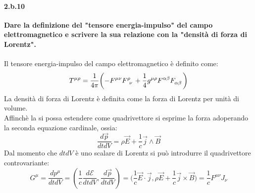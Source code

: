 \documentclass[twoside]{article}
\begin{document}
\paragraph{2.b.10}\textbf{Dare la definizione del "tensore energia-impulso" del campo elettromagnetico e
scrivere la sua relazione con la "densità di forza di Lorentz".}\\ \\
Il tensore energia-impulso del campo elettromagnetico è definito come:
\begin{equation}
    \tensor{T}{^\mu^\rho}=\frac{1}{4\pi} \biggl( -\tensor{F}{^\mu^\nu}\tensor{F}{^\rho_\nu}+\frac{1}{4}\tensor{g}{^\mu^\rho}\tensor{F}{^\alpha^\beta}\tensor{F}{_\alpha_\beta} \biggr)
\end{equation}
La densità di forza di Lorentz è definita come la forza di Lorentz per unità di volume.
\\
Affinchè la si possa estendere come quadrivettore si esprime la forza adoperando la seconda equazione cardinale, ossia:
\begin{equation}
    \frac{d\vec{p}}{dtdV}=\rho \vec{E}+\frac{1}{c}\vec{j}\wedge \vec{B}
\end{equation}
Dal momento che $dtdV$ è uno scalare di Lorentz si può introdurre il quadrivettore controvariante:
\begin{equation}\label{densità di forza}
    G^{\mu}=\frac{dp^{\mu}}{dtdV}=\left( \frac{1}{c}\frac{d\mathcal{E}}{dtdV},\frac{d\vec{p}}{dtdV} \right)=\biggl(\frac{1}{c}\vec{E}\cdot \vec{j},\rho \vec{E}+\frac{1}{c}\vec{j}\times\vec{B}\biggr)=\frac{1}{c}F^{\mu \nu}J_\nu
\end{equation}
\end{document}
